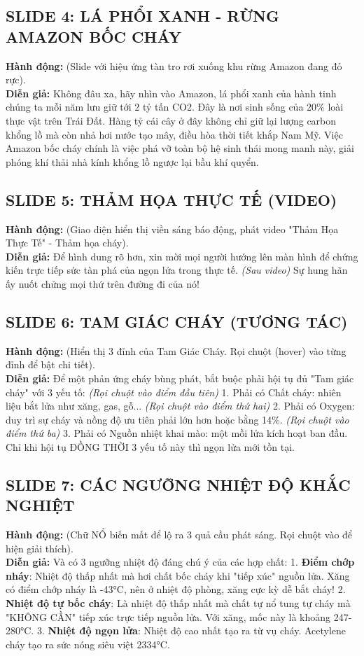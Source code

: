 \documentclass[13pt,a4paper]{article}
\begin{document}
\subsection*{SLIDE 4: LÁ PHỔI XANH - RỪNG AMAZON BỐC CHÁY}
\textbf{Hành động:} (Slide với hiệu ứng tàn tro rơi xuống khu rừng Amazon đang đỏ rực).\\
\textbf{Diễn giả:} Không đâu xa, hãy nhìn vào Amazon, lá phổi xanh của hành tinh chúng ta mỗi năm lưu giữ tới 2 tỷ tấn CO2. Đây là nơi sinh sống của 20\% loài thực vật trên Trái Đất. Hàng tỷ cái cây ở đây không chỉ giữ lại lượng carbon khổng lồ mà còn nhả hơi nước tạo mây, điều hòa thời tiết khắp Nam Mỹ. Việc Amazon bốc cháy chính là việc phá vỡ toàn bộ hệ sinh thái mong manh này, giải phóng khí thải nhà kính khổng lồ ngược lại bầu khí quyển.

\subsection*{SLIDE 5: THẢM HỌA THỰC TẾ (VIDEO)}
\textbf{Hành động:} (Giao diện hiển thị viền sáng báo động, phát video "Thảm Họa Thực Tế" - Thảm họa cháy).\\
\textbf{Diễn giả:} Để hình dung rõ hơn, xin mời mọi người hướng lên màn hình để chứng kiến trực tiếp sức tàn phá của ngọn lửa trong thực tế. 
\textit{(Sau video)} Sự hung hãn ấy nuốt chửng mọi thứ trên đường đi của nó!

\subsection*{SLIDE 6: TAM GIÁC CHÁY (TƯƠNG TÁC)}
\textbf{Hành động:} (Hiển thị 3 đỉnh của Tam Giác Cháy. Rọi chuột (hover) vào từng đỉnh để bật chi tiết).\\
\textbf{Diễn giả:} Để một phản ứng cháy bùng phát, bắt buộc phải hội tụ đủ "Tam giác cháy" với 3 yếu tố:
\textit{(Rọi chuột vào điểm đầu tiên)} 1. Phải có Chất cháy: nhiên liệu bắt lửa như xăng, gas, gỗ...
\textit{(Rọi chuột vào điểm thứ hai)} 2. Phải có Oxygen: duy trì sự cháy và nồng độ ưu tiên phải lớn hơn hoặc bằng 14\%.
\textit{(Rọi chuột vào điểm thứ ba)} 3. Phải có Nguồn nhiệt khai mào: một mồi lửa kích hoạt ban đầu.
Chỉ khi hội tụ ĐỒNG THỜI 3 yếu tố này thì ngọn lửa mới tồn tại.

\subsection*{SLIDE 7: CÁC NGƯỠNG NHIỆT ĐỘ KHẮC NGHIỆT}
\textbf{Hành động:} (Chữ NỔ biến mất để lộ ra 3 quả cầu phát sáng. Rọi chuột vào để hiện giải thích).\\
\textbf{Diễn giả:} Và có 3 ngưỡng nhiệt độ đáng chú ý của các hợp chất:
1. \textbf{Điểm chớp nháy}: Nhiệt độ thấp nhất mà hơi chất bốc cháy khi "tiếp xúc" nguồn lửa. Xăng có điểm chớp nháy là -43°C, nên ở nhiệt độ phòng, xăng cực kỳ dễ bắt cháy!
2. \textbf{Nhiệt độ tự bốc cháy}: Là nhiệt độ thấp nhất mà chất tự nổ tung tự cháy mà "KHÔNG CẦN" tiếp xúc trực tiếp nguồn lửa. Với xăng, mốc này là khoảng 247-280°C.
3. \textbf{Nhiệt độ ngọn lửa}: Nhiệt độ cao nhất tạo ra từ vụ cháy. Acetylene cháy tạo ra sức nóng siêu việt 2334°C.
\end{document}
